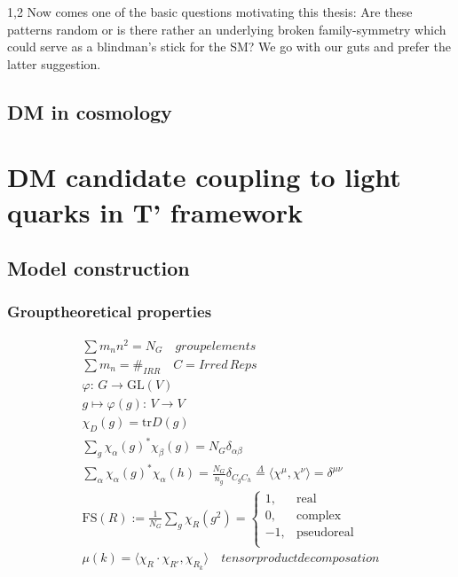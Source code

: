 \documentclass[11pt,a4paper,twoside]{article}
\begin{document}
\begin{spacing}{1,2}
Now comes one of the basic questions motivating this thesis: Are these patterns random or is there rather an underlying broken family-symmetry which
could serve as a blindman's stick for the SM? We go with our guts and prefer the latter suggestion.

\subsection{DM in cosmology}

\section{DM candidate coupling to light quarks in T' framework}
\subsection{Model construction}
\subsubsection{Grouptheoretical properties}
\begin{align}
 \sum m_n n^2 = N_G \quad groupelements\\
 \sum m_n = \#_{IRR} \quad C = Irred\,Reps\\
 \varphi:\, G\rightarrow \text{GL}(V)\\
 g\mapsto \varphi(g):\, V\rightarrow V\\
 \chi_D(g) = \text{tr}D(g)\\
 \sum_g \chi_\alpha(g)^*\chi_\beta(g) = N_G \delta_{\alpha\beta}\\
 \sum_\alpha \chi_\alpha(g)^*\chi_\alpha(h) = \frac{N_G}{n_g} \delta_{C_g C_h} \stackrel{\Lambda}{=} \langle \chi^\mu, \chi^\nu \rangle = \delta^{\mu\nu}\\
 \text{FS}(R) := \frac{1}{N_G} \sum_g \chi_R(g^2) =\begin{cases}
                                                    1, & \text{real}\\
                                                    0, & \text{complex}\\
                                                    -1, & \text{pseudoreal}\\
                                                   \end{cases}\\
 \mu(k) = \langle \chi_R \cdot \chi_{R'} , \chi_{R_k} \rangle \quad tensor product decomposation\\
\end{align}


\end{spacing}
\end{document}
